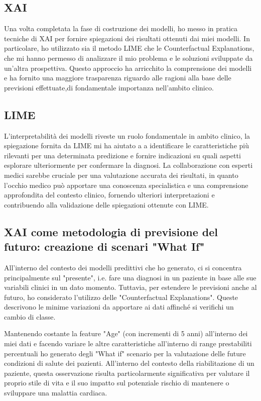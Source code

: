 \begin{flushleft}
\section{XAI}
Una volta completata la fase di costruzione dei modelli,
ho messo in pratica tecniche di XAI per fornire spiegazioni dei risultati ottenuti dai miei modelli. In particolare, ho utilizzato sia il metodo LIME che le Counterfactual Explanations, che mi hanno permesso di analizzare il mio problema e le soluzioni sviluppate da un'altra prospettiva. Questo approccio ha arricchito la comprensione dei modelli e ha fornito una maggiore trasparenza riguardo alle ragioni alla base delle previsioni effettuate,di fondamentale importanza nell'ambito clinico.

\subsection{LIME}
L'interpretabilità dei modelli riveste un ruolo fondamentale in ambito clinico, la spiegazione fornita da LIME mi ha aiutato a a identificare le caratteristiche più rilevanti per una determinata predizione e fornire indicazioni su quali aspetti esplorare ulteriormente per confermare la diagnosi.
La collaborazione con esperti medici sarebbe cruciale per una valutazione accurata dei risultati, in quanto l'occhio medico può apportare una conoscenza specialistica e una comprensione approfondita del contesto clinico, fornendo ulteriori interpretazioni e contribuendo alla validazione delle spiegazioni ottenute con LIME.

\subsection{XAI come metodologia di previsione del futuro: creazione di scenari "What If"}

All'interno del contesto dei modelli predittivi che ho generato, ci si concentra principalmente sul "presente", i.e. fare una diagnosi in un paziente in base alle sue variabili clinici in un dato momento. Tuttavia, per estendere le previsioni anche al futuro, ho considerato l'utilizzo delle "Counterfactual Explanations". Queste descrivono le minime variazioni da apportare ai dati affinché si verifichi un cambio di classe.

Mantenendo costante la feature "Age" (con incrementi di 5 anni) all'interno dei miei dati e facendo variare le altre caratteristiche all'interno di range prestabiliti percentuali ho generato degli "What if" scenario per la  valutazione delle future condizioni di salute dei pazienti.
All'interno del contesto della riabilitazione di un paziente, questa osservazione risulta particolarmente significativa per valutare il proprio stile di vita e il suo impatto sul potenziale rischio di mantenere o sviluppare una malattia cardiaca.


\end{flushleft}
